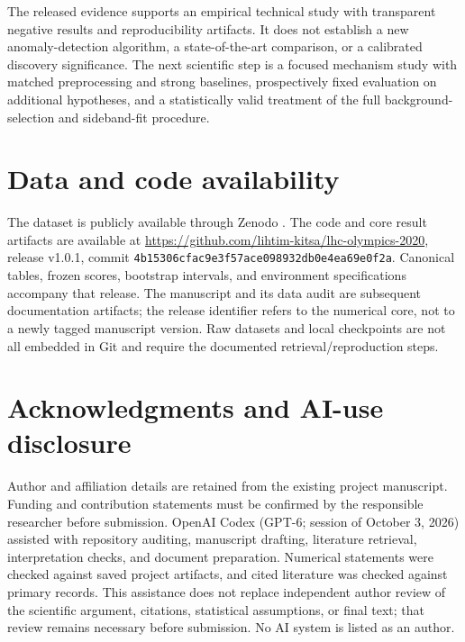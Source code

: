 \documentclass[reprint,aps,pra,amsmath,amssymb,floatfix,raggedbottom]{revtex4-2}
\begin{document}
The released evidence supports an empirical technical study with transparent negative results and reproducibility artifacts. It does not establish a new anomaly-detection algorithm, a state-of-the-art comparison, or a calibrated discovery significance. The next scientific step is a focused mechanism study with matched preprocessing and strong baselines, prospectively fixed evaluation on additional hypotheses, and a statistically valid treatment of the full background-selection and sideband-fit procedure.

\section*{Data and code availability}
The dataset is publicly available through Zenodo \cite{dataset}. The code and core result artifacts are available at \url{https://github.com/lihtim-kitsa/lhc-olympics-2020}, release v1.0.1, commit \texttt{4b15306cfac9e3f57ace098932db0e4ea69e0f2a}. Canonical tables, frozen scores, bootstrap intervals, and environment specifications accompany that release. The manuscript and its data audit are subsequent documentation artifacts; the release identifier refers to the numerical core, not to a newly tagged manuscript version. Raw datasets and local checkpoints are not all embedded in Git and require the documented retrieval/reproduction steps.

\section*{Acknowledgments and AI-use disclosure}
Author and affiliation details are retained from the existing project manuscript. Funding and contribution statements must be confirmed by the responsible researcher before submission. OpenAI Codex (GPT-6; session of October 3, 2026) assisted with repository auditing, manuscript drafting, literature retrieval, interpretation checks, and document preparation. Numerical statements were checked against saved project artifacts, and cited literature was checked against primary records. This assistance does not replace independent author review of the scientific argument, citations, statistical assumptions, or final text; that review remains necessary before submission. No AI system is listed as an author.

\appendix
\end{document}
